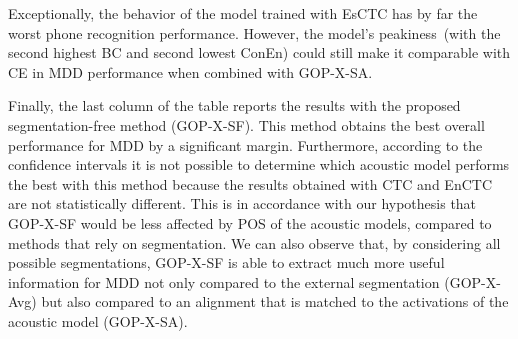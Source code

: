 Exceptionally, the behavior of the model trained with EsCTC has by far the worst phone recognition performance.
However, the model's peakiness~(with the second highest BC and second lowest ConEn) could still make it comparable with CE in MDD performance when combined with GOP-X-SA.

Finally, the last column of the table reports the results with the proposed segmentation-free method (GOP-X-SF).
This method obtains the best overall performance for MDD by a significant margin.
Furthermore, according to the confidence intervals it is not possible to determine which acoustic model performs the best with this method because the results obtained with CTC and EnCTC are not statistically different.
This is in accordance with our hypothesis that GOP-X-SF would be less affected by POS of the acoustic models, compared to methods that rely on segmentation.
We can also observe that, by considering all possible segmentations, GOP-X-SF is able to extract much more useful information for MDD not only compared to the external segmentation (GOP-X-Avg) but also compared to an alignment that is matched to the activations of the acoustic model (GOP-X-SA).

